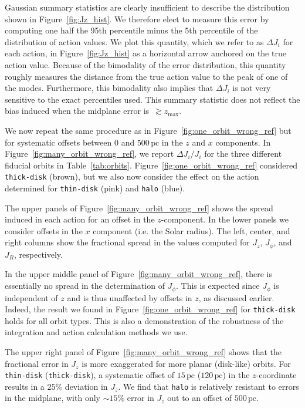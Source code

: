 \documentclass[twocolumn]{aastex62}
\newcommand{\pc}{\text{pc}}
\newcommand{\thin}{\texttt{thin-disk}}
\newcommand{\thick}{\texttt{thick-disk}}
\newcommand{\halo}{\texttt{halo}}
\newcommand{\thincolor}{pink}
\newcommand{\thickcolor}{brown}
\newcommand{\halocolor}{blue}
\begin{document}
Gaussian summary statistics are clearly insufficient to describe the distribution shown in
Figure~\ref{fig:Jz_hist}. We therefore elect to measure this error by computing one
half the 95th percentile minus the 5th percentile of the distribution
of action values. We plot this quantity, which we refer to as $\Delta J_i$ for each action, in Figure~\ref{fig:Jz_hist} as a
horizontal arrow anchored on the true action value. Because of the bimodality
of the error distribution, this quantity roughly measures the distance from
the true action value to the peak of one of the modes. Furthermore, this
bimodality also implies that $\Delta J_i$ is not very sensitive to the exact
percentiles used. This summary statistic does not reflect the bias induced
when the midplane error is~$\gtrsim z_{\text{max}}$.

We now repeat the same procedure as in Figure~\ref{fig:one_orbit_wrong_ref}
but for systematic offsets between $0$ and $500\,\pc$ in the $z$ and $x$
components. In Figure~\ref{fig:many_orbit_wrong_ref}, we report $\Delta
J_i/J_i$ for the three different fiducial orbits in Table~\ref{tab:orbits}.
Figure~\ref{fig:one_orbit_wrong_ref} considered \thick{} (\thickcolor), but we also now consider the effect on
the action determined for \thin{} (\thincolor) and \halo{} (\halocolor).

The upper panels of Figure~\ref{fig:many_orbit_wrong_ref} shows the spread
induced in each action for an offset in the $z$-component. In the lower panels we consider offsets in the $x$ component (i.e. the
Solar radius). The left, center, and right columns show the fractional spread
in the values computed for $J_z$, $J_{\phi}$, and $J_R$, respectively.

In the upper middle panel of Figure~\ref{fig:many_orbit_wrong_ref}, there is
essentially no spread in the determination of $J_{\phi}$. This is expected
since $J_{\phi}$ is independent of $z$ and is thus unaffected by offsets in
$z$, as discussed earlier. Indeed, the result we found in
Figure~\ref{fig:one_orbit_wrong_ref} for \thick{} holds for all
orbit types. This is also a demonstration of the robustness of the
integration and action calculation methods we use.

The upper right panel of Figure~\ref{fig:many_orbit_wrong_ref} shows that the
fractional error in $J_z$ is more exaggerated for more planar (disk-like)
orbits. For \thin{} (\thick{}), a systematic offset of $15\,\pc$ ($120\,\pc$) in the $z$-coordinate results in a $25\%$ deviation in $J_z$.
We find that \halo{} is relatively resistant to errors in the midplane, with
only $\sim15\%$ error in $J_z$ out to an offset of $500\,\pc$.
\end{document}
